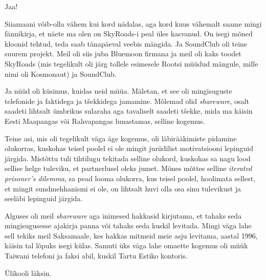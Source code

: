 
Jaa!  

Siiamaani võib-olla vähem kui kord nädalas, aga kord kuus vähemalt saame mingi 
fännikirja, et näete ma olen on SkyRoads-i peal üles kasvanud. On isegi mõned 
kloonid tehtud,  teda saab tänapäeval veebis mängida. Ja SoundClub oli teine 
suurem projekt. Meil oli siis juba Bluemoon firmana ja meil oli kaks toodet 
SkyRoads (mis tegelikult oli järg tollele esimesele Rootsi müüdud mängule, 
mille nimi oli Kosmonaut) ja SoundClub. 

Ja nüüd oli küsimus, kuidas neid müüa. Mäletan, et see oli mingisuguste 
telefonide ja faktidega ja tšekkidega jamamine. Mõlemad olid \emph{shareware}, 
osalt saadeti lihtsalt ümbrikus sularaha aga tavaliselt saadeti tšekke, mida ma 
käisin Eesti Maapangas või Rahvapangas lunastamas, selline kogemus. 

Teine asi, mis oli tegelikult väga äge kogemus, oli läbirääkimiste pidamine 
olukorras, kuskohas teisel poolel ei ole mingit juriidilist motivatsiooni 
lepinguid järgida. Mistõttu tuli tihtilugu tekitada selline olukord, kuskohas 
sa nagu lood sellise helge tuleviku, et partnerlusel oleks jumet. Mõnes mõttes 
selline \emph{iterated prisoner's dilemma}, sa pead looma olukorra, kus teisel poolel, hoolimata sellest, et 
mingit sundmehhanismi ei ole, on lihtsalt huvi olla osa sinu tulevikust ja 
seeläbi lepinguid järgida.

Alguses oli meil \emph{shareware} aga inimesed hakkasid kirjutama, et tahaks 
seda mingisugusesse ajakirja panna või tahaks seda kuskil levitada. Mingi väga 
lahe sell tekiks meil Saksamaale, kes hakkas mitmeid meie asju levitama, aastal 
1996, käisin tal lõpuks isegi külas. Samuti üks väga lahe omaette kogemus oli 
müük Taiwani telefoni ja faksi abil, kuskil Tartu Estiko 
kontoris. 


Ülikooli läksin.

